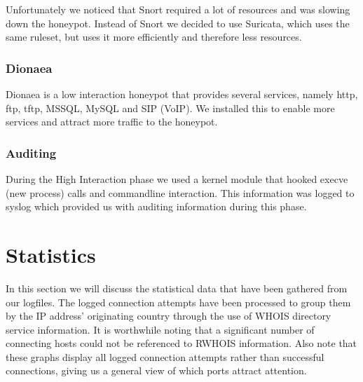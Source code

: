 \documentclass[11pt]{article}
\begin{document}
Unfortunately we noticed that Snort required a lot of resources and was slowing down the honeypot. Instead of Snort we decided to use Suricata, which uses the same ruleset, but uses it more efficiently and therefore less resources.

\subsubsection{Dionaea}
Dionaea is a low interaction honeypot that provides several services, namely http, ftp, tftp, MSSQL, MySQL and SIP (VoIP). We installed this to enable more services and attract more traffic to the honeypot. 


\subsubsection{Auditing}
During the High Interaction phase we used a kernel module that hooked execve (new process) calls and commandline interaction. This information was logged to syslog which provided us with auditing information during this phase.



\section{Statistics}
\label{Statistics}
In this section we will discuss the statistical data that have been gathered from our logfiles. 
The logged connection attempts have been processed to group them by the IP address' originating country through the use of WHOIS directory service information.
It is worthwhile noting that a significant number of connecting hosts could not be referenced to RWHOIS information.
Also note that these graphs display all logged connection attempts rather than successful connections, giving us a general view of which ports attract attention.
\end{document}
